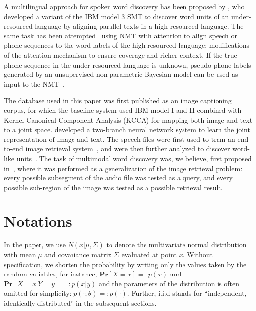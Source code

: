 \documentclass[journal]{IEEEtran}
\begin{document}
A multilingual approach for spoken word discovery has been proposed by \cite{Stahlberg12}, who developed a variant of the IBM model 3 SMT to discover word units of an under-resourced language
by aligning parallel texts in
a high-resourced language.
The same task has been attempted~\cite{Duong16} using NMT with attention \cite{Bahdanau14} to align speech or phone sequences to the word labels of the high-resourced language; modifications of the attention mechanism to ensure coverage and richer context.
If the true phone sequence in the under-resourced language is unknown,  pseudo-phone labels generated by an unsupervised non-parametric Bayesian model \cite{Ondel2018} can be used as input to the NMT~\cite{Godard2018}.
 
The database used in this paper was first published as an image captioning corpus, for which the baseline system
\cite{Hodosh2010} used IBM model I and II \cite{Brown93} combined with Kernel Canonical Component Analysis (KCCA) for mapping both image and text to a joint space. \cite{Karpathy14, Karpathy15} developed a two-branch neural network system to learn the joint representation of image and text.
The speech files were first used to train an end-to-end image retrieval system~\cite{Harwath15,Harwath16-ULO}, and were then further analyzed to discover word-like units~\cite{Harwath17}.
The task of multimodal word discovery was, we believe, first proposed in~\cite{Harwath17}, where it was performed as a generalization of the image retrieval problem: every possible subsegment of the audio file was tested as a query, and every possible sub-region of the image was tested as a possible retrieval result.

\section{Notations}
In the paper, 
we use $N(x|\mu, \Sigma)$ to denote the multivariate normal distribution with mean $\mu$ and covariance matrix $\Sigma$ evaluated at point $x$. Without specification, we shorten the probability by writing only the values taken by the random variables, for instance, $\mathbf{Pr}[X=x]=: p(x)$ and $\mathbf{Pr}[X=x|Y=y]=: p(x|y)$ and the parameters of the distribution is often omitted for simplicity: $p(\cdot;\theta) =: p(\cdot)$. Further, i.i.d stands for ``independent, identically distributed'' in the subsequent sections. 
\end{document}
